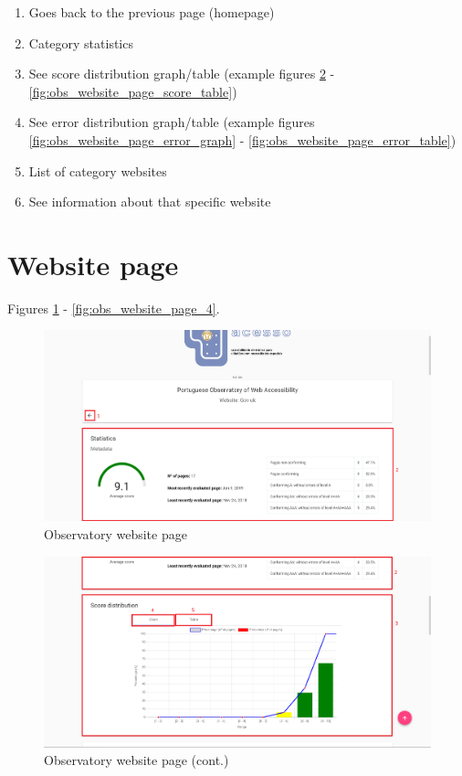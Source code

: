 \begin{enumerate}
    \item Goes back to the previous page (homepage)
    \item Category statistics
    \item See score distribution graph/table (example figures \ref{fig:obs_website_page_score_graph} - \ref{fig:obs_website_page_score_table})
    \item See error distribution graph/table (example figures \ref{fig:obs_website_page_error_graph} - \ref{fig:obs_website_page_error_table})
    \item List of category websites
    \item See information about that specific website
\end{enumerate}

\clearpage

\section{Website page}

Figures \ref{fig:obs_website_page} - \ref{fig:obs_website_page_4}.

\begin{figure}[H]
    \centering
    \includegraphics[width=\linewidth]{lib/images/observatory/observatory_website_page.png}
    \caption{Observatory website page}
    \label{fig:obs_website_page}
\end{figure}

\begin{figure}[H]
    \centering
    \includegraphics[width=\linewidth]{lib/images/observatory/observatory_website_page_score_graph.png}
    \caption{Observatory website page (cont.)}
    \label{fig:obs_website_page_score_graph}
\end{figure}

